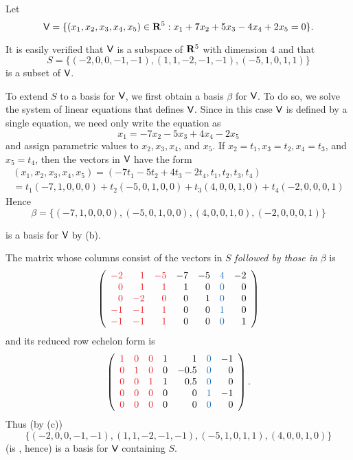 \begin{example} \label{example 3.4.4}
Let
\[
    \textsf{V} = \{
        (x_1, x_2, x_3, x_4, x_5) \in \mathbf{R}^5
        : x_1 + 7x_2 + 5x_3 - 4x_4 + 2x_5 = 0
    \}.
\]

It is easily verified that \(\textsf{V}\) is a subspace of \(\mathbf{R}^{5}\) with dimension \(4\) and that
\[
    S = \{(-2,0,0,-1,-1),(1,1,-2,-1,-1),(-5,1,0,1,1)\}
\]
is a \LID{} subset of \(\textsf{V}\).

To extend \(S\) to a basis for \(\textsf{V}\), we first obtain a basis  \(\beta\) for \(\textsf{V}\).
To do so, we solve the system of linear equations that defines \(\textsf{V}\).
Since in this case \(\textsf{V}\) is defined by a single equation, we need only write the equation as
\[
    x_1 = -7 x_2 - 5 x_3 + 4 x_4 - 2 x_5
\]
and assign parametric values to \(x_2, x_3, x_4\), and \(x_5\).
If \(x_2 = t_1, x_3 = t_2, x_4 = t_3\), and \(x_5 = t_4\), then the vectors in \(\textsf{V}\) have the form
\[
\begin{array}{l}
    (x_1, x_2, x_3, x_4, x_5) = (-7 t_1 - 5 t_2 + 4 t_3 - 2 t_4, t_1, t_2, t_3, t_4) \\
    = t_1(-7,1,0,0,0) + t_2(-5,0,1,0,0) + t_3(4,0,0,1,0) + t_4(-2,0,0,0,1)
\end{array}
\]
Hence
\[
    \beta = \{(-7,1,0,0,0),(-5,0,1,0,0),(4,0,0,1,0),(-2,0,0,0,1)\}
\]

is a basis for \(\textsf{V}\) by (b).

The matrix whose columns consist of the vectors in \(S\) \emph{followed by those in} \(\beta\) is
\[
    \left(\begin{array}{rrrrrrr}
        \RED{-2} & \RED{1}  & \RED{-5} & -7 & -5 & \BLUE{4} & -2 \\
        \RED{0}  & \RED{1}  & \RED{1}  &  1 &  0 & \BLUE{0} & 0 \\
        \RED{0}  & \RED{-2} & \RED{0}  &  0 &  1 & \BLUE{0} & 0 \\
        \RED{-1} & \RED{-1} & \RED{1}  &  0 &  0 & \BLUE{1} & 0 \\
        \RED{-1} & \RED{-1} & \RED{1}  &  0 &  0 & \BLUE{0} & 1
    \end{array}\right)
\]
and its reduced row echelon form is
\[
    \left(\begin{array}{llllrlr}
        \RED{1} & \RED{0} & \RED{0} & 1 &    1 & \BLUE{0} & -1 \\
        \RED{0} & \RED{1} & \RED{0} & 0 & -0.5 & \BLUE{0} & 0 \\
        \RED{0} & \RED{0} & \RED{1} & 1 &  0.5 & \BLUE{0} & 0 \\
        \RED{0} & \RED{0} & \RED{0} & 0 &    0 & \BLUE{1} & -1 \\
        \RED{0} & \RED{0} & \RED{0} & 0 &    0 & \BLUE{0} & 0
\end{array}\right).
\]
Thus (by (c))
\[
    \{(-2,0,0,-1,-1),(1,1,-2,-1,-1),(-5,1,0,1,1),(4,0,0,1,0)\}
\]
(is \LID{}, hence) is a basis for \(\textsf{V}\) containing \(S\).
\end{example}
